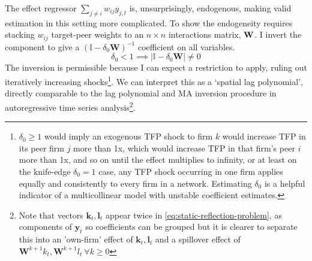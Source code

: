The  effect regressor $\sum_{j\neq i} w_{ij} y_{j,t}$ is, unsurprisingly, endogenous,
making valid estimation in this setting more complicated.
To show the endogeneity requires stacking $w_{ij}$ target-peer weights to an $n\times n$ interactions matrix, $\textbf W$.
I invert the  component to give a $(\mathbb I-\delta_0\mathbf W)^{-1}$ coefficient on all variables.
\begin{equation}
    \delta_0 < 1 \implies \vert \mathbb I-\delta_0 \mathbf W \vert \neq 0
\end{equation}
The inversion is permissible because I can expect a restriction to apply, ruling out iteratively increasing shocks\footnote{
    $\delta_0\geq1$ would imply an exogenous TFP shock to firm $k$ would
    increase TFP in its peer firm $j$ more than 1x,
    which would increase TFP in that firm's peer $i$ more than 1x,
    and so on until the effect multiplies to infinity,
    or at least on the knife-edge $\delta_0=1$ case,
    any TFP shock occurring in one firm applies equally
    and consistently to every firm in a network.
    Estimating $\delta_0$ is a helpful indicator of a multicollinear model
    with unstable coefficient estimates.
}. We can interpret this as a `spatial lag polynomial', directly comparable
to the lag polynomial and MA inversion procedure in autoregressive time series analysis\footnote{
    Note that vectors $\mathbf k_t, \mathbf l_t$ appear twice in \eqref{eq:static-reflection-problem},
    as components of $\mathbf y_t$ so coefficients can be grouped
    but it is clearer to separate this into an 'own-firm'
    effect of $\mathbf k_t, \mathbf l_t$ and a spillover effect of
    $\mathbf W^{k+1}k_t, \mathbf W^{k+1}l_t\ \forall k\geq 0$
}.
